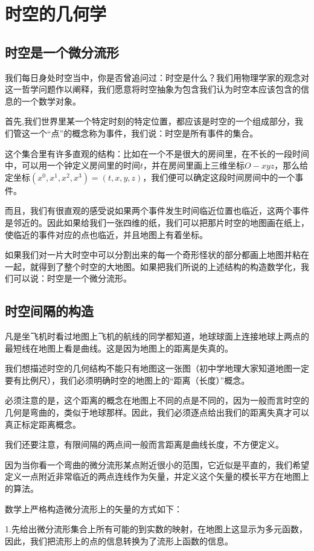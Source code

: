 \documentclass{article}
\begin{document}
\section{时空的几何学}
\subsection{时空是一个微分流形}
我们每日身处时空当中，你是否曾追问过：时空是什么？我们用物理学家的观念对这一哲学问题作以阐释，我们愿意将时空抽象为包含我们认为时空本应该包含的信息的一个数学对象。

首先,我们世界里某一个特定时刻的特定位置，都应该是时空的一个组成部分，我们管这一个“点”的概念称为事件，我们说：时空是所有事件的集合。

这个集合里有许多直观的结构：比如在一个不是很大的房间里，在不长的一段时间中，可以用一个钟定义房间里的时间$t$，并在房间里画上三维坐标$O-xyz$，那么给定坐标$(x^0,x^1,x^2,x^3)=(t,x,y,z)$，我们便可以确定这段时间房间中的一个事件。

而且，我们有很直观的感受说如果两个事件发生时间临近位置也临近，这两个事件是邻近的。因此如果给我们一张四维的纸，我们可以把那片时空的地图画在纸上，使临近的事件对应的点也临近，并且地图上有着坐标。

如果我们对一片大时空中可以分割出来的每一个奇形怪状的部分都画上地图并粘在一起，就得到了整个时空的大地图。如果把我们所说的上述结构的构造数学化，我们可以说：时空是一个微分流形。

\subsection{时空间隔的构造}
凡是坐飞机时看过地图上飞机的航线的同学都知道，地球球面上连接地球上两点的最短线在地图上看是曲线。这是因为地图上的距离是失真的。

我们想描述时空的几何结构不能只有地图这一张图（初中学地理大家知道地图一定要有比例尺），我们必须明确时空的地图上的“距离（长度）”概念。

必须注意的是，这个距离的概念在地图上不同的点是不同的，因为一般而言时空的几何是弯曲的，类似于地球那样。因此，我们必须逐点给出我们的距离失真才可以真正标定距离概念。

我们还要注意，有限间隔的两点间一般而言距离是曲线长度，不方便定义。

因为当你看一个弯曲的微分流形某点附近很小的范围，它近似是平直的，我们希望定义一点附近非常临近的两点连线作为矢量，并定义这个矢量的模长平方在地图上的算法。

数学上严格构造微分流形上的矢量的方式如下：

1.先给出微分流形集合上所有可能的到实数的映射，在地图上这显示为多元函数，因此，我们把流形上的点的信息转换为了流形上函数的信息。
\end{document}
